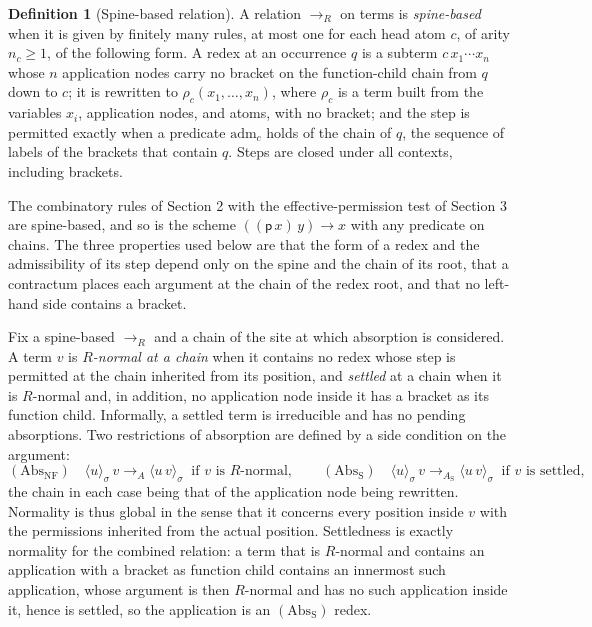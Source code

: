 \documentclass[11pt]{article}
\theoremstyle{definition}
\newtheorem{definition}[theorem]{Definition}
\theoremstyle{remark}
\newcommand{\br}[2]{\langle #1\rangle_{#2}}
\begin{document}
\begin{definition}[Spine-based relation]
A relation $\to_R$ on terms is \emph{spine-based} when it is given by finitely many rules, at most one for each head atom $c$, of arity $n_c\ge1$, of the following form. A redex at an occurrence $q$ is a subterm $c\,x_1\cdots x_n$ whose $n$ application nodes carry no bracket on the function-child chain from $q$ down to $c$; it is rewritten to $\rho_c(x_1,\dots,x_n)$, where $\rho_c$ is a term built from the variables $x_i$, application nodes, and atoms, with no bracket; and the step is permitted exactly when a predicate $\mathrm{adm}_c$ holds of the chain of $q$, the sequence of labels of the brackets that contain $q$. Steps are closed under all contexts, including brackets.
\end{definition}

The combinatory rules of Section 2 with the effective-permission test of Section 3 are spine-based, and so is the scheme $((\mathsf p\,x)\,y)\to x$ with any predicate on chains. The three properties used below are that the form of a redex and the admissibility of its step depend only on the spine and the chain of its root, that a contractum places each argument at the chain of the redex root, and that no left-hand side contains a bracket.

Fix a spine-based $\to_R$ and a chain of the site at which absorption is considered. A term $v$ is \emph{$R$-normal at a chain} when it contains no redex whose step is permitted at the chain inherited from its position, and \emph{settled} at a chain when it is $R$-normal and, in addition, no application node inside it has a bracket as its function child. Informally, a settled term is irreducible and has no pending absorptions. Two restrictions of absorption are defined by a side condition on the argument:
\[
(\mathrm{Abs}_{\mathrm{NF}})\quad \br u\sigma\,v\to_A\br{u\,v}\sigma\ \text{ if $v$ is $R$-normal},\qquad
(\mathrm{Abs}_{\mathrm S})\quad \br u\sigma\,v\to_{A_{\mathrm S}}\br{u\,v}\sigma\ \text{ if $v$ is settled},
\]
the chain in each case being that of the application node being rewritten. Normality is thus global in the sense that it concerns every position inside $v$ with the permissions inherited from the actual position. Settledness is exactly normality for the combined relation: a term that is $R$-normal and contains an application with a bracket as function child contains an innermost such application, whose argument is then $R$-normal and has no such application inside it, hence is settled, so the application is an $(\mathrm{Abs}_{\mathrm S})$ redex.
\end{document}
